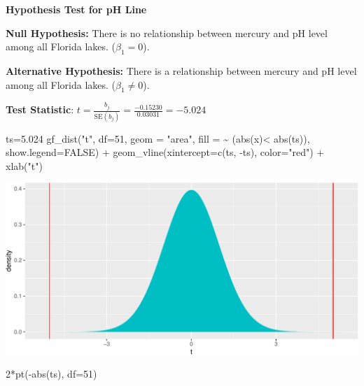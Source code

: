 \documentclass[
  letterpaper,
  DIV=11,
  numbers=noendperiod]{scrreprt}
\newenvironment{Shaded}{\begin{snugshade}}{\end{snugshade}}
\newcommand{\AttributeTok}[1]{\textcolor[rgb]{0.40,0.45,0.13}{#1}}
\newcommand{\ConstantTok}[1]{\textcolor[rgb]{0.56,0.35,0.01}{#1}}
\newcommand{\DecValTok}[1]{\textcolor[rgb]{0.68,0.00,0.00}{#1}}
\newcommand{\FloatTok}[1]{\textcolor[rgb]{0.68,0.00,0.00}{#1}}
\newcommand{\FunctionTok}[1]{\textcolor[rgb]{0.28,0.35,0.67}{#1}}
\newcommand{\NormalTok}[1]{\textcolor[rgb]{0.00,0.23,0.31}{#1}}
\newcommand{\OtherTok}[1]{\textcolor[rgb]{0.00,0.23,0.31}{#1}}
\newcommand{\SpecialCharTok}[1]{\textcolor[rgb]{0.37,0.37,0.37}{#1}}
\newcommand{\StringTok}[1]{\textcolor[rgb]{0.13,0.47,0.30}{#1}}
\begin{document}
\textbf{Hypothesis Test for pH Line}

\textbf{Null Hypothesis:} There is no relationship between mercury and
pH level among all Florida lakes. (\(\beta_1=0\)).

\textbf{Alternative Hypothesis:} There is a relationship between mercury
and pH level among all Florida lakes. (\(\beta_1 \neq 0\)).

\textbf{Test Statistic}:
\(t=\frac{{b_j}}{\text{SE}(b_j)} = \frac{-0.15230}{0.03031} = -5.024\)

\begin{Shaded}
\begin{Highlighting}[]
\NormalTok{ts}\OtherTok{=}\FloatTok{5.024}
\FunctionTok{gf\_dist}\NormalTok{(}\StringTok{"t"}\NormalTok{, }\AttributeTok{df=}\DecValTok{51}\NormalTok{, }\AttributeTok{geom =} \StringTok{"area"}\NormalTok{, }\AttributeTok{fill =} \SpecialCharTok{\textasciitilde{}}\NormalTok{ (}\FunctionTok{abs}\NormalTok{(x)}\SpecialCharTok{\textless{}} \FunctionTok{abs}\NormalTok{(ts)), }\AttributeTok{show.legend=}\ConstantTok{FALSE}\NormalTok{) }\SpecialCharTok{+} \FunctionTok{geom\_vline}\NormalTok{(}\AttributeTok{xintercept=}\FunctionTok{c}\NormalTok{(ts, }\SpecialCharTok{{-}}\NormalTok{ts), }\AttributeTok{color=}\StringTok{"red"}\NormalTok{)  }\SpecialCharTok{+} \FunctionTok{xlab}\NormalTok{(}\StringTok{"t"}\NormalTok{)}
\end{Highlighting}
\end{Shaded}

\includegraphics{Ch4_files/figure-pdf/unnamed-chunk-68-1.pdf}

\begin{Shaded}
\begin{Highlighting}[]
\DecValTok{2}\SpecialCharTok{*}\FunctionTok{pt}\NormalTok{(}\SpecialCharTok{{-}}\FunctionTok{abs}\NormalTok{(ts), }\AttributeTok{df=}\DecValTok{51}\NormalTok{)}
\end{Highlighting}
\end{Shaded}
\end{document}
